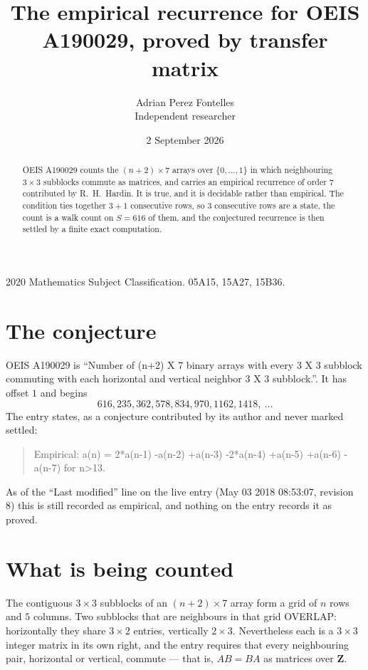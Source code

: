 \documentclass[11pt,a4paper]{article}
\title{The empirical recurrence for OEIS A190029, proved by transfer matrix}
\author{Adrian Perez Fontelles\\ \small Independent researcher}
\date{2 September 2026}
\theoremstyle{plain}
\theoremstyle{definition}
\begin{document}
\maketitle

\begin{abstract}
OEIS A190029 counts the $(n+2)\times7$ arrays over $\{0,\dots,1\}$ in which
neighbouring $3\times3$ subblocks commute as matrices, and carries an empirical
recurrence
of order $7$ contributed by R.~H.~Hardin. It is true, and it is decidable rather than
empirical. The condition ties together $3+1$ consecutive rows, so $3$ consecutive rows are
a state, the count is a walk count on $S=616$ of them, and the conjectured recurrence is then
settled by a finite exact computation.
\end{abstract}

\noindent\small 2020 Mathematics Subject Classification. 05A15, 15A27, 15B36.\normalsize

\section{The conjecture}

OEIS A190029 is ``Number of (n+2) X 7 binary arrays with every 3 X 3 subblock commuting with each horizontal and vertical neighbor 3 X 3 subblock.''. It has offset $1$ and begins
\[
616, 235, 362, 578, 834, 970, 1162, 1418,\ \dots
\]
The entry states, as a conjecture contributed by its author and never marked settled:
\begin{quote}
Empirical: a(n) = 2*a(n-1) -a(n-2) +a(n-3) -2*a(n-4) +a(n-5) +a(n-6) -a(n-7) for n>13.
\end{quote}
As of the ``Last modified'' line on the live entry (May 03 2018 08:53:07, revision 8) this is still
recorded as empirical, and nothing on the entry records it as proved.

\section{What is being counted}

The contiguous $3\times3$ subblocks of an $(n+2)\times7$ array form a grid of $n$
rows and $5$ columns. Two subblocks that are neighbours in that
grid OVERLAP: horizontally they share $3\times2$ entries, vertically
$2\times3$. Nevertheless each is a $3\times3$ integer matrix in its own right, and
the entry requires that every neighbouring pair, horizontal or vertical, commute --- that is,
$AB=BA$ as matrices over $\mathbf{Z}$.
\end{document}
